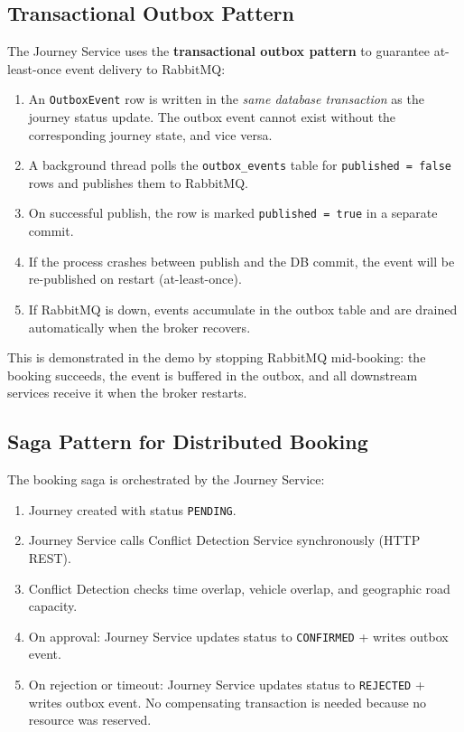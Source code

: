 \documentclass[12pt,a4paper]{article}
\begin{document}
\subsection{Transactional Outbox Pattern}

The Journey Service uses the \textbf{transactional outbox pattern} to guarantee at-least-once event delivery to RabbitMQ:

\begin{enumerate}[leftmargin=*]
  \item An \texttt{OutboxEvent} row is written in the \emph{same database transaction} as the journey status update. The outbox event cannot exist without the corresponding journey state, and vice versa.
  \item A background thread polls the \texttt{outbox\_events} table for \texttt{published = false} rows and publishes them to RabbitMQ.
  \item On successful publish, the row is marked \texttt{published = true} in a separate commit.
  \item If the process crashes between publish and the DB commit, the event will be re-published on restart (at-least-once).
  \item If RabbitMQ is down, events accumulate in the outbox table and are drained automatically when the broker recovers.
\end{enumerate}

This is demonstrated in the demo by stopping RabbitMQ mid-booking: the booking succeeds, the event is buffered in the outbox, and all downstream services receive it when the broker restarts.

\subsection{Saga Pattern for Distributed Booking}

The booking saga is orchestrated by the Journey Service:

\begin{enumerate}[leftmargin=*]
  \item Journey created with status \texttt{PENDING}.
  \item Journey Service calls Conflict Detection Service synchronously (HTTP REST).
  \item Conflict Detection checks time overlap, vehicle overlap, and geographic road capacity.
  \item On approval: Journey Service updates status to \texttt{CONFIRMED} + writes outbox event.
  \item On rejection or timeout: Journey Service updates status to \texttt{REJECTED} + writes outbox event. No compensating transaction is needed because no resource was reserved.
\end{enumerate}
\end{document}
